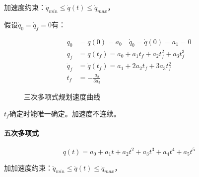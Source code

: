 \documentclass[
12pt, %
a4paper, 
oneside, %
headinclude,footinclude, %
]{scrartcl}
\begin{document}
加速度约束：$ \dot{q}_{min} \leq \dot{q}(t) \leq \dot{q}_{max} $，

假设$ \dot{q}_0 = \dot{q}_f = 0 $有： \\
\begin{minipage}{0.6\textwidth}
\begin{align*} 
q_0 &= q(0) = a_0 \quad \dot{q}_0 = \dot{q}(0) = a_1 = 0 \\
q_f &= q(t_f) = a_0 + a_1 t_f + a_2 t_f^2 + a_3 t_f^3 \\
\dot{q}_f &= \dot{q}(t_f) = a_1 + 2a_2 t_f + 3a_3 t_f^2 \\
t_f &= -\frac{a_2}{3a_3}
\end{align*}
\end{minipage}
\hfill
\begin{minipage}{0.4\textwidth}
\begin{figure}[H]
\centering
{}
\caption{三次多项式规划速度曲线}
\end{figure}
\end{minipage}

$ t_f $确定时能唯一确定。加速度不连续。
\paragraph{五次多项式}
$$ q(t) = a_0 + a_1 t + a_2 t^2 + a_3 t^3 + a_4 t^4 + a_5 t^5 $$

加加速度约束：$ \ddot{q}_{min} \leq \ddot{q}(t) \leq \ddot{q}_{max} $，
\end{document}
